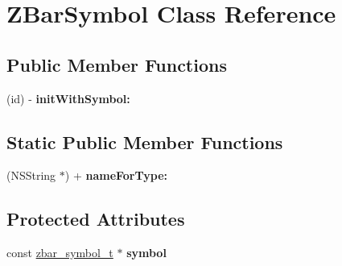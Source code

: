 \hypertarget{interface_z_bar_symbol}{
\section{ZBarSymbol Class Reference}
\label{interface_z_bar_symbol}
}
\subsection*{Public Member Functions}
\begin{DoxyCompactItemize}
\item 
\hypertarget{interface_z_bar_symbol_ad9a6c08a381696351814e0e9b7bd23f7}{
(id) -\/ {\bfseries initWithSymbol:}}
\label{interface_z_bar_symbol_ad9a6c08a381696351814e0e9b7bd23f7}

\end{DoxyCompactItemize}
\subsection*{Static Public Member Functions}
\begin{DoxyCompactItemize}
\item 
\hypertarget{interface_z_bar_symbol_afa0ff94ded03b741cdb918cc488a29c2}{
(NSString $\ast$) + {\bfseries nameForType:}}
\label{interface_z_bar_symbol_afa0ff94ded03b741cdb918cc488a29c2}

\end{DoxyCompactItemize}
\subsection*{Protected Attributes}
\begin{DoxyCompactItemize}
\item 
\hypertarget{interface_z_bar_symbol_a8c070f865426610bd4b571e697b60523}{
const \hyperlink{zbar_8h_a55b659c1945f2984b5ec8386127e5c43}{zbar\_\-symbol\_\-t} $\ast$ {\bfseries symbol}}
\label{interface_z_bar_symbol_a8c070f865426610bd4b571e697b60523}

\end{DoxyCompactItemize}
